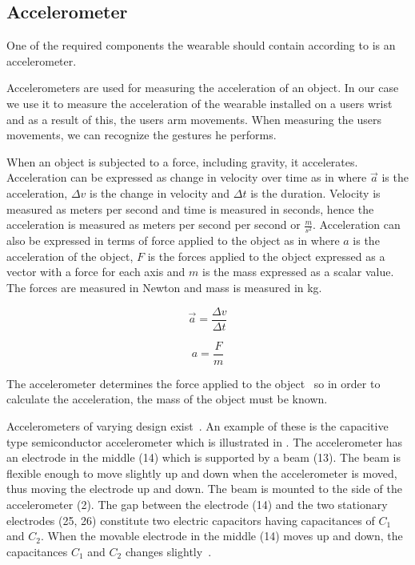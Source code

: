 \subsection{Accelerometer}
One of the required components the wearable should contain according to  is an accelerometer.

Accelerometers are used for measuring the acceleration of an object. In our case we use it to measure the acceleration of the wearable installed on a users wrist and as a result of this, the users arm movements. When measuring the users movements, we can recognize the gestures he performs.

When an object is subjected to a force, including gravity, it accelerates. Acceleration can be expressed as change in velocity over time as in  where $\vec{a}$ is the acceleration, $\Delta v$ is the change in velocity and $\Delta t$ is the duration.
Velocity is measured as meters per second and time is measured in seconds, hence the acceleration is measured as meters per second per second or $\frac{m}{s^2}$.
Acceleration can also be expressed in terms of force applied to the object as in  where $a$ is the acceleration of the object, $F$ is the forces applied to the object expressed as a vector with a force for each axis and $m$ is the mass expressed as a scalar value.
The forces are measured in Newton and mass is measured in kg.

\begin{centering}
\begin{minipage}{.5\linewidth}
    \begin{equation}
    \vec{a} = \frac{\Delta v}{\Delta t}
    \label{eq:acceleration-delta-velocity}
    \end{equation}
\end{minipage}
\begin{minipage}{.5\linewidth}
    \begin{equation}
    a = \frac{F}{m}
    \label{eq:acceleration-force}
    \end{equation}
\end{minipage}
\end{centering}

The accelerometer determines the force applied to the object~\cite[pp. 392-393]{Fraden:2112745} so in order to calculate the acceleration, the mass of the object must be known.

Accelerometers of varying design exist~\cite[pp. 392-411]{Fraden:2112745}. An example of these is the capacitive type semiconductor accelerometer which is illustrated in . The accelerometer has an electrode in the middle (14) which is supported by a beam (13). The beam is flexible enough to move slightly up and down when the accelerometer is moved, thus moving the electrode up and down. The beam is mounted to the side of the accelerometer (2). The gap between the electrode (14) and the two stationary electrodes (25, 26) constitute two electric capacitors having capacitances of $C_1$ and $C_2$.
When the movable electrode in the middle (14) moves up and down, the capacitances $C_1$ and $C_2$ changes slightly~\cite{kloeck1993capacitive}.

